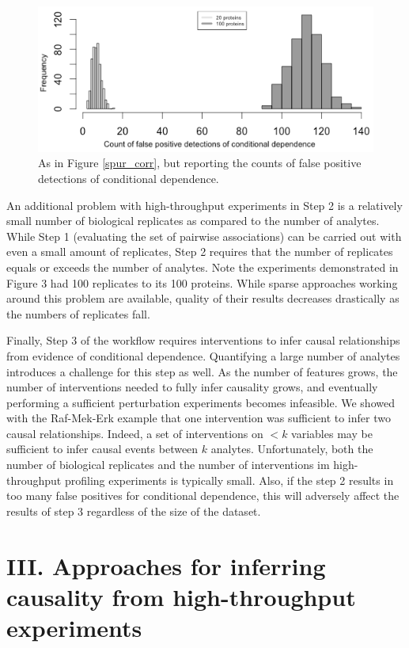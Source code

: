 \documentclass[journal=jacsat,manuscript=article]{achemso}
\begin{document}
\begin{figure}[!tpb]
\centerline{\includegraphics[width=1\textwidth]{figs/spurious_dep.png}}
\caption{As in Figure \ref{spur_corr}, but reporting the counts of false positive detections of conditional dependence.}
\label{spur_dep}
\end{figure}

An additional problem with high-throughput experiments in Step 2 is a relatively small number of biological replicates as compared to the number of analytes. While Step 1 (evaluating the set of pairwise associations) can be carried out with even a small amount of replicates, Step 2 requires that the number of replicates equals or exceeds the number of analytes.  Note the experiments demonstrated in Figure 3 had 100 replicates to its 100 proteins.  While sparse approaches working around this problem are available, quality of their results decreases drastically as the numbers of replicates fall.    

Finally, Step 3 of the workflow requires interventions to infer causal relationships from evidence of conditional dependence.  Quantifying a large number of analytes introduces a  challenge for this step as well. As the number of features grows, the number of interventions needed to fully infer causality grows, and eventually performing a sufficient perturbation experiments becomes infeasible.   We showed with the Raf-Mek-Erk example that one intervention was sufficient to infer two causal relationships. Indeed, a set of interventions on $< k$ variables may be sufficient to infer causal events between $k$ analytes. Unfortunately, both the number of biological replicates and the number of interventions im high-throughput profiling experiments is typically small.  Also, if the step 2 results in too many false positives for conditional dependence, this will adversely affect the results of step 3 regardless of the size of the dataset.


\section{III. Approaches for inferring causality from high-throughput experiments}
\end{document}
